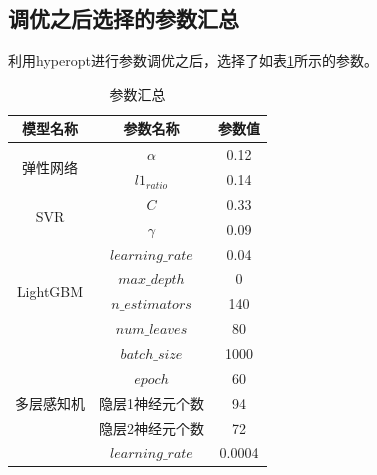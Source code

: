 \documentclass{article}
\begin{document}
\begin{multicols}{2}
\subsection{调优之后选择的参数汇总}
利用hyperopt进行参数调优之后，选择了如表\ref{tab:参数汇总}所示的参数。
\begin{table}[H]
	\centering 
	\begin{tabular}{|c|cc|}
		\hline 
		模型名称 & 参数名称 & 参数值 \\\hline 
		\multirow{2}{*}{弹性网络} & $\alpha$ & 0.12\\  
		 & $l1_{ratio}$ & 0.14 \\\hline 
		 \multirow{2}{*}{SVR} & $C$ & 0.33 \\
		  & $\gamma$ & 0.09\\\hline
		  \multirow{4}{*}{LightGBM}
		  & $learning\_rate$ & 0.04\\
		  & $max\_depth$ & 0\\
		  & $n\_estimators$ & 140\\
		  & $num\_leaves$ & 80\\\hline 
		  \multirow{5}{*}{多层感知机} & $batch\_size$ & 1000\\
		  
		  & $epoch$ & 60\\
		  & 隐层1神经元个数 & 94\\
		  & 隐层2神经元个数 & 72\\ 
		  & $learning\_rate$ & 0.0004\\\hline  
	\end{tabular}
\caption{参数汇总}
\label{tab:参数汇总}
\end{table}


\end{multicols}
\end{document}
